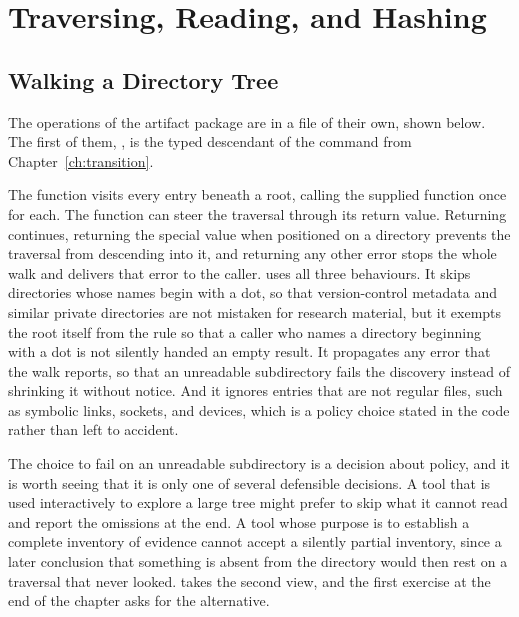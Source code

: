 \chapter{Traversing, Reading, and Hashing}
\label{ch:traversal}

\section{Walking a Directory Tree}

The operations of the artifact package are in a file of their own, shown below. The first of them, , is the typed descendant of the  command from Chapter~\ref{ch:transition}.


The function  visits every entry beneath a root, calling the supplied function once for each. The function can steer the traversal through its return value. Returning  continues, returning the special value  when positioned on a directory prevents the traversal from descending into it, and returning any other error stops the whole walk and delivers that error to the caller.  uses all three behaviours. It skips directories whose names begin with a dot, so that version-control metadata and similar private directories are not mistaken for research material, but it exempts the root itself from the rule so that a caller who names a directory beginning with a dot is not silently handed an empty result. It propagates any error that the walk reports, so that an unreadable subdirectory fails the discovery instead of shrinking it without notice. And it ignores entries that are not regular files, such as symbolic links, sockets, and devices, which is a policy choice stated in the code rather than left to accident.

The choice to fail on an unreadable subdirectory is a decision about policy, and it is worth seeing that it is only one of several defensible decisions. A tool that is used interactively to explore a large tree might prefer to skip what it cannot read and report the omissions at the end. A tool whose purpose is to establish a complete inventory of evidence cannot accept a silently partial inventory, since a later conclusion that something is absent from the directory would then rest on a traversal that never looked. \golab{} takes the second view, and the first exercise at the end of the chapter asks for the alternative.

